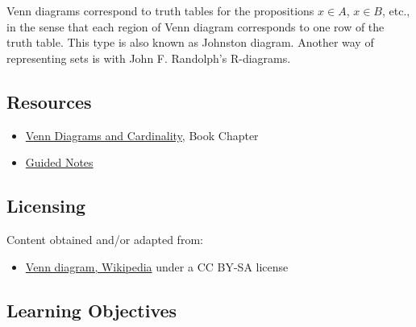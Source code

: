 Venn diagrams correspond to truth tables for the propositions $x\in A$, $x\in B$, etc., in
the sense that each region of Venn diagram corresponds to one row of the truth table. This
type is also known as Johnston diagram. Another way of representing sets is with John F.
Randolph's R-diagrams.




\subsection{Resources}
\label{sss:reso-55b5}




\begin{itemize}
    \item \href{https://mathresearch.utsa.edu/wikiFiles/MAT1053/Venn_Diagrams_and_Cardinality/MAT1053_M11.2Venn_Diagrams_and_Cardinality.pdf}{Venn Diagrams and Cardinality}, Book Chapter
    \item \href{https://mathresearch.utsa.edu/wikiFiles/MAT1053/Venn_Diagrams_and_Cardinality/MAT1053_M11.2Venn_Diagrams_and_CardinalityGN.pdf}{Guided Notes}
\end{itemize}


\subsection{Licensing}
\label{sss:lice-7352}




Content obtained and/or adapted from:



\begin{itemize}
    \item \href{https://en.wikipedia.org/wiki/Venn_diagram}{Venn diagram, Wikipedia} under a CC BY-SA license
\end{itemize}


\subsection{Learning Objectives}
\label{ssec:lear-fe6e}


